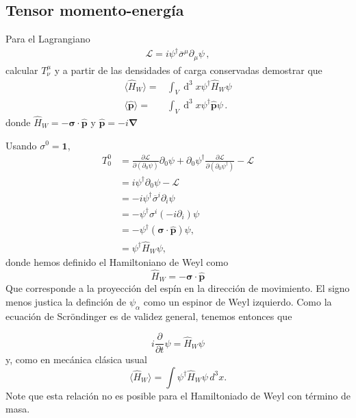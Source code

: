 \subsection{Tensor momento-energía}
\label{sec:tens-momento-energi}
\begin{frame}


Para el Lagrangiano
\begin{align*}
    \mathcal{L}=i \psi^{\dagger} \overline{\sigma}^{\mu} \partial_{\mu} \psi\,,
\end{align*}
calcular $T^{\mu}_{\nu}$ y a partir de  las densidades of carga conservadas demostrar que
\begin{align*}
  \langle\hat{H}_{W}\rangle=&\int_{V} \operatorname{d}^{3} x \psi^{\dagger} \hat{H}_{W} \psi \\
 \langle\hat{\boldsymbol{p}}\rangle=&\int_{V} \operatorname{d}^{3} x \psi^{\dagger}\hat{\boldsymbol{p}} \psi\,. 
\end{align*}
donde $\hat{H}_{W}=-\boldsymbol{\sigma} \cdot \hat{\boldsymbol{p}}$ y $\hat{\boldsymbol{p}}=-i \boldsymbol{\nabla}$


  Usando $\sigma^{0}=\boldsymbol{1}$,
\begin{align}
  T^0_0&=\frac{\partial\mathcal{L}}{\partial\left(\partial_0\psi\right)}\partial_0\psi+\partial_0\psi^\dagger\frac{\partial\mathcal{L}}{\partial\left(\partial_0\psi^\dagger\right)}-\mathcal{L}\nonumber\\
  &=i\psi^\dagger\partial_0\psi-\mathcal{L}\nonumber\\
  &=-i\psi^\dagger \overline{\sigma}^i\partial_i\psi\nonumber\\
  &=-\psi^\dagger \sigma^i \left( -i \partial_i\right)\psi\nonumber\\
  &=-\psi^\dagger(\boldsymbol{\sigma}\cdot\widehat{\boldsymbol{p}})\psi,\nonumber\\
  \label{eq:118qft}
  &=\psi^\dagger\hat{H}_{W} \psi,
\end{align}
donde hemos definido el Hamiltoniano de Weyl como
\begin{equation}
  \label{eq:denshal}
  \hat{H}_W= -\boldsymbol{\sigma}\cdot\widehat{\boldsymbol{p}}
\end{equation}
Que corresponde a la proyección del espín en la dirección de movimiento. El signo menos justica la definción de $\psi_{\alpha}$ como un espinor de Weyl izquierdo. Como la ecuación de Scröndinger es de validez general, tenemos entonces que

\begin{equation}
  i\frac{\partial}{\partial t}\psi=\hat{H}_W \psi
\end{equation}
y, como en mecánica clásica usual
\begin{equation}
  \label{eq:99qft}
  \langle\hat{H}_W\rangle=\int \psi^\dagger\hat{H}_W \psi\,d^3x.
\end{equation}
Note que esta relación no es posible para el Hamiltoniado de Weyl con término de masa.


\end{frame}

